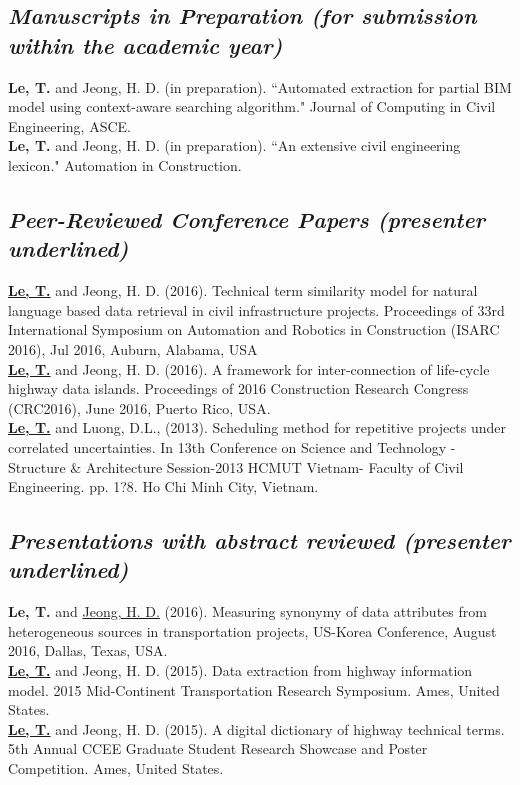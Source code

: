 \documentclass[11pt]{article}
\begin{document}
\subsection*{\sl Manuscripts in Preparation (for submission within the academic year)}
{\bf Le, T.} and Jeong, H. D. (in preparation). ``Automated extraction for partial BIM model using context-aware searching algorithm." Journal of Computing in Civil Engineering, ASCE.\\
{\bf Le, T.} and Jeong, H. D. (in preparation). ``An extensive civil engineering lexicon." Automation in Construction.

\subsection*{\sl Peer-Reviewed Conference Papers  (presenter underlined)}
{\bf \underline{Le, T.}} and Jeong, H. D. (2016). Technical term similarity model for natural language based data retrieval in civil infrastructure projects. Proceedings of 33rd International Symposium on Automation and Robotics in Construction (ISARC 2016), Jul 2016, Auburn, Alabama, USA\\
{\bf \underline{Le, T.}} and Jeong, H. D. (2016). A framework for inter-connection of life-cycle highway data islands. Proceedings of 2016 Construction Research Congress (CRC2016), June 2016, Puerto Rico, USA.\\
{\bf \underline{Le, T.}} and Luong, D.L., (2013). Scheduling method for repetitive projects under correlated uncertainties. In 13th Conference on Science and Technology - Structure \& Architecture Session-2013 HCMUT Vietnam- Faculty of Civil Engineering. pp. 1?8. Ho Chi Minh City, Vietnam.

\subsection*{\sl Presentations with abstract reviewed (presenter underlined)} 
{\bf Le, T.} and  \underline{Jeong, H. D.}  (2016). Measuring synonymy of data attributes from heterogeneous sources in transportation projects, US-Korea Conference, August 2016, Dallas, Texas, USA.\\
{\bf \underline{Le, T.}}  and Jeong, H. D. (2015). Data extraction from highway information model. 2015 Mid-Continent Transportation Research Symposium. Ames, United States. \\
{\bf \underline{Le, T.}}  and Jeong, H. D. (2015). A digital dictionary of highway technical terms. 5th Annual CCEE Graduate Student Research Showcase and Poster Competition. Ames, United States.
\end{document}
